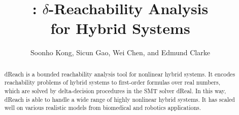 \documentclass{llncs}
\title{\dReach{}: $\delta$-Reachability Analysis\\ for Hybrid Systems}
\newcommand{\dReal}{\textsf{dReal}}
\newcommand{\dReach}{\textsf{dReach}}
\begin{document}
\mainmatter  %

\author{Soonho Kong, Sicun Gao, Wei Chen, and Edmund Clarke}
\maketitle

\begin{abstract}
  \dReach{} is a bounded reachability analysis tool for nonlinear
  hybrid systems. It encodes reachability problems of hybrid systems
  to first-order formulas over real numbers, which are solved by
  delta-decision procedures in the SMT solver \dReal{}. In this way,
  \dReach{} is able to handle a wide range of highly nonlinear hybrid
  systems. It has scaled well on various realistic models
  from biomedical and robotics applications.
\end{abstract}










%
\end{document}
